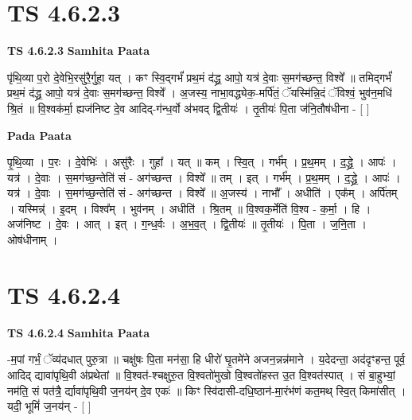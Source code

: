 \documentclass[17pt]{extarticle}
\begin{document}
\section*{ TS 4.6.2.3 }

\textbf{TS 4.6.2.3 } \newline
\textbf{Samhita Paata} \newline

पृ॑थि॒व्या प॒रो दे॒वेभि॒रसु॑रै॒र्गुहा॒ यत् । कꣳ स्वि॒द्गर्भं॑ प्रथ॒मं द॑द्ध्र॒ आपो॒ यत्र॑ दे॒वाः स॒मग॑च्छन्त॒ विश्वे᳚ ॥ तमिद्गर्भं॑ प्रथ॒मं द॑द्ध्र॒ आपो॒ यत्र॑ दे॒वाः स॒मग॑च्छन्त॒ विश्वे᳚ । अ॒जस्य॒ नाभा॒वद्ध्येक॒-मर्पि॑तं॒ ॅयस्मि॑न्नि॒दं ॅविश्वं॒ भुव॑न॒मधि॑ श्रि॒तं ॥ वि॒श्वक॑र्मा॒ ह्यज॑निष्ट दे॒व आदिद्-ग॑न्ध॒र्वो अ॑भवद् द्वि॒तीयः॑ । तृ॒तीयः॑ पि॒ता ज॑नि॒तौष॑धीना - [  ] \newline

\textbf{Pada Paata} \newline

पृ॒थि॒व्या । प॒रः । दे॒वेभिः॑ । असु॑रैः । गुहा᳚ । यत् ॥ कम् । स्वि॒त् । गर्भ᳚म् । प्र॒थ॒मम् । द॒द्ध्रे॒ । आपः॑ । यत्र॑ । दे॒वाः । स॒मग॑च्छ॒न्तेति॑ सं - अग॑च्छन्त । विश्वे᳚ ॥ तम् । इत् । गर्भ᳚म् । प्र॒थ॒मम् । द॒द्ध्रे॒ । आपः॑ । यत्र॑ । दे॒वाः । स॒मग॑च्छ॒न्तेति॑ सं - अग॑च्छन्त । विश्वे᳚ ॥ अ॒जस्य॑ । नाभौ᳚ । अधीति॑ । एक᳚म् । अर्पि॑तम् । यस्मिन्न्॑ । इ॒दम् । विश्व᳚म् । भुव॑नम् । अधीति॑ । श्रि॒तम् ॥ वि॒श्वक॒र्मेति॑ वि॒श्व - क॒र्मा॒ । हि । अज॑निष्ट । दे॒वः । आत् । इत् । ग॒न्ध॒र्वः । अ॒भ॒व॒त् । द्वि॒तीयः॑ ॥ तृ॒तीयः॑ । पि॒ता । ज॒नि॒ता । ओष॑धीनाम् ।  \newline




\section*{ TS 4.6.2.4 }

\textbf{TS 4.6.2.4 } \newline
\textbf{Samhita Paata} \newline

-म॒पां गर्भं॒ ॅव्य॑दधात् पुरु॒त्रा ॥ चक्षु॑षः पि॒ता मन॑सा॒ हि धीरो॑ घृ॒तमे॑ने अजन॒न्नन्न॑माने । य॒देदन्ता॒ अद॑दृꣳहन्त॒ पूर्व॒ आदिद् द्यावा॑पृथि॒वी अ॑प्रथेतां ॥ वि॒श्वत॑-श्चक्षुरु॒त वि॒श्वतो॑मुखो वि॒श्वतो॑हस्त उ॒त वि॒श्वत॑स्पात् । सं बा॒हुभ्यां॒ नम॑ति॒ सं पत॑त्रै॒ र्द्यावा॑पृथि॒वी ज॒नय॑न् दे॒व एकः॑ ॥ किꣳ स्वि॑दासी-दधि॒ष्ठान॑-मा॒रंभ॑णं कत॒मथ् स्वि॒त् किमा॑सीत् । यदी॒ भूमिं॑ ज॒नय॑न् - [  ] \newline
\end{document}
